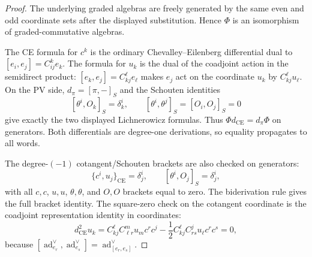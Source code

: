 \begin{proof}
  The underlying graded algebras are freely generated by the same even
  and odd coordinate sets after the displayed substitution.  Hence
  \(\Phi\) is an isomorphism of graded-commutative algebras.

  The CE formula for \(c^k\) is the ordinary Chevalley--Eilenberg
  differential dual to \([e_i,e_j]=C^k_{ij}e_k\).  The formula for \(u_k\)
  is the dual of the coadjoint action in the semidirect product:
  \([e_k,e_j]=C^\ell_{kj}e_\ell\) makes \(e_j\) act on the coordinate
  \(u_k\) by \(C^\ell_{kj}u_\ell\).  On the PV side,
  \(d_\pi=[\pi,-]_S\) and the Schouten identities
  \[
    [\theta^i,O_k]_S=\delta^i_k,\qquad
    [\theta^i,\theta^j]_S=[O_i,O_j]_S=0
  \]
  give exactly the two displayed Lichnerowicz formulas.  Thus
  \(\Phi d_{\mathrm{CE}}=d_\pi\Phi\) on generators.  Both differentials
  are degree-one derivations, so equality propagates to all words.

  The degree-\((-1)\) cotangent/Schouten brackets are also checked on
  generators:
  \[
    \{c^i,u_j\}_{\mathrm{CE}}=\delta^i_j,\qquad
    [\theta^i,O_j]_S=\delta^i_j,
  \]
  with all \(c,c\), \(u,u\), \(\theta,\theta\), and \(O,O\) brackets
  equal to zero.  The biderivation rule gives the full bracket identity.
  The square-zero check on the cotangent coordinate is the coadjoint
  representation identity in coordinates:
  \[
    d_{\mathrm{CE}}^2u_k
    =
    C^\ell_{kj}C^m_{\ell r}u_m c^r c^j
    -\frac12 C^\ell_{kj}C^j_{rs}u_\ell c^r c^s
    =0,
  \]
  because
  \([\operatorname{ad}^{\vee}_{e_r},\operatorname{ad}^{\vee}_{e_s}]
    =\operatorname{ad}^{\vee}_{[e_r,e_s]}\).
\end{proof}

